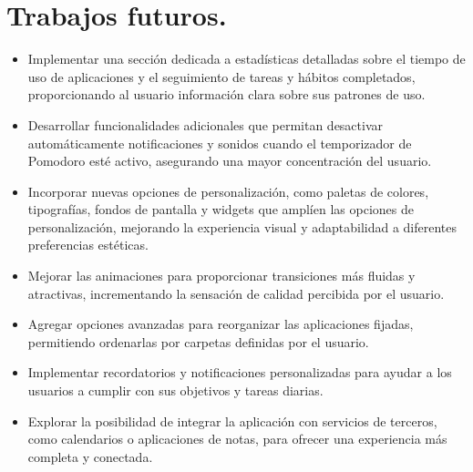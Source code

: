 \pagebreak

\section{Trabajos futuros.}
\label{sec:trabajos_futuros}

\begin{itemize}
    \item Implementar una sección dedicada a estadísticas detalladas sobre el tiempo de uso de aplicaciones y el seguimiento de tareas y hábitos completados, proporcionando al usuario información clara sobre sus patrones de uso.
    \item Desarrollar funcionalidades adicionales que permitan desactivar automáticamente notificaciones y sonidos cuando el temporizador de Pomodoro esté activo, asegurando una mayor concentración del usuario.
    \item Incorporar nuevas opciones de personalización, como paletas de colores, tipografías, fondos de pantalla y widgets que amplíen las opciones de personalización, mejorando la experiencia visual y adaptabilidad a diferentes preferencias estéticas.
    \item Mejorar las animaciones para proporcionar transiciones más fluidas y atractivas, incrementando la sensación de calidad percibida por el usuario.
    \item Agregar opciones avanzadas para reorganizar las aplicaciones fijadas, permitiendo ordenarlas por carpetas definidas por el usuario.
    \item Implementar recordatorios y notificaciones personalizadas para ayudar a los usuarios a cumplir con sus objetivos y tareas diarias.
    \item Explorar la posibilidad de integrar la aplicación con servicios de terceros, como calendarios o aplicaciones de notas, para ofrecer una experiencia más completa y conectada.
\end{itemize}